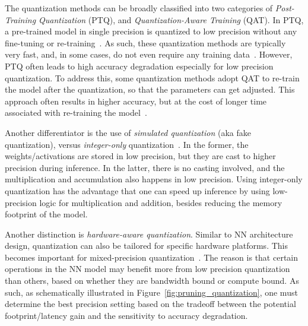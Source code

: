 The quantization methods can be broadly classified into two categories of \emph{Post-Training Quantization} (PTQ),
and \emph{Quantization-Aware Training} (QAT). In PTQ, a pre-trained model in single precision is quantized to low precision
without any fine-tuning or re-training~\cite{banner2018post,meller2019same,choukroun2019low,zhao2019improving,fang2020post,fang2020near,lee2018quantization,nagel2019data,cai2020zeroq,hawks2021ps}. As such, these quantization methods are typically very fast, and, in some cases, do not even require any training data~\cite{cai2020zeroq, haroush2020knowledge,nagel2019data}.
However, PTQ often leads to high accuracy degradation especially for low precision quantization.
To address this, some quantization methods adopt QAT to re-train the model after the quantization, so that the parameters can
get adjusted. 
This approach often results in higher accuracy, but at the cost of longer
time associated with re-training the model~\cite{courbariaux2015binaryconnect,lin2015neural,hubara2016binarized,rastegari2016xnor,zhou2016dorefa,zhu2016trained,cai2017deep,hou2016loss,gysel2018ristretto,huang2021codenet,zhou2018explicit}.

Another differentiator is the use of \emph{simulated quantization} (aka fake quantization), versus \emph{integer-only} quantization~\cite{jacob2018quantization,yao2020hawqv3,kim2021bert,lin2016fixed}. In the former, 
the weights/activations are stored in low precision, but they are cast to higher precision during
inference. In the latter, there is no casting involved, and the multiplication and accumulation also happens
in low precision. Using integer-only quantization has the advantage that one can speed up
inference by using low-precision logic for multiplication and addition, besides reducing the memory footprint of the model.


Another distinction is \emph{hardware-aware quantization}. 
Similar to NN architecture design, quantization can also be tailored for specific hardware platforms.
This becomes important for mixed-precision quantization~\cite{zhou2018adaptive, wang2018haq, wu2018mixed, hawq, shen2020q, hawqv2, dong2021hao, yao2020hawqv3}.
The reason is that certain operations in the NN model may benefit more from low precision
quantization than others, based on whether they are bandwidth bound or compute bound.
As such, as schematically
illustrated in Figure~\ref{fig:pruning_quantization},
one must determine the best precision setting based on the tradeoff between the potential footprint/latency gain and the sensitivity to accuracy degradation.

